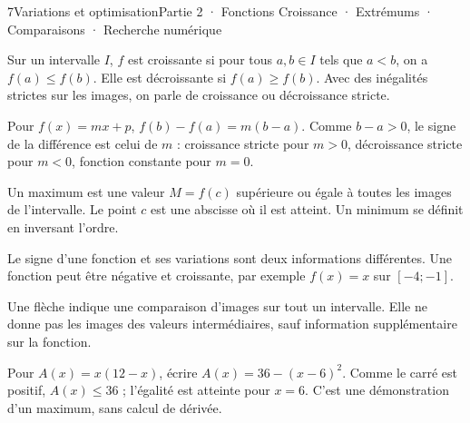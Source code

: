 \begin{ouverture}[courbe]{7}{Variations et optimisation}{Partie 2 · Fonctions}
{Croissance · Extrémums · Comparaisons · Recherche numérique}
\end{ouverture}
\pagestyle{otMain}\essentiel\fontsize{11}{15}\selectfont
{}
\begin{definition}Sur un intervalle $I$, $f$ est croissante si pour tous $a,b\in I$ tels que $a<b$, on a $f(a)\le f(b)$. Elle est décroissante si $f(a)\ge f(b)$. Avec des inégalités strictes sur les images, on parle de croissance ou décroissance stricte.\end{definition}
\begin{propriete}Pour $f(x)=mx+p$, $f(b)-f(a)=m(b-a)$. Comme $b-a>0$, le signe de la différence est celui de $m$ : croissance stricte pour $m>0$, décroissance stricte pour $m<0$, fonction constante pour $m=0$.\end{propriete}
\begin{definition}Un maximum est une valeur $M=f(c)$ supérieure ou égale à toutes les images de l’intervalle. Le point $c$ est une abscisse où il est atteint. Un minimum se définit en inversant l’ordre.\end{definition}
\begin{attention}Le signe d’une fonction et ses variations sont deux informations différentes. Une fonction peut être négative et croissante, par exemple $f(x)=x$ sur $[-4;-1]$.\end{attention}
\begin{savoirfaire}Une flèche indique une comparaison d’images sur tout un intervalle. Elle ne donne pas les images des valeurs intermédiaires, sauf information supplémentaire sur la fonction.\end{savoirfaire}
\begin{center}\begin{tableau}
\end{tableau}\par{}\end{center}
\clearpage
{}
\begin{savoirfaire}
Pour $A(x)=x(12-x)$, écrire $A(x)=36-(x-6)^2$. Comme le carré est positif, $A(x)\le36$ ; l’égalité est atteinte pour $x=6$. C’est une démonstration d’un maximum, sans calcul de dérivée.
\end{savoirfaire}
